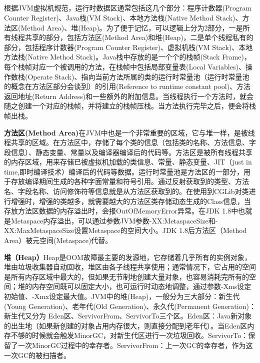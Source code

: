 \documentclass[../../../interview-questions.tex]{subfiles}
\begin{document}
\subsection{\color{red}{Java内存模型(Java Memory Model)}}

根据JVM虚拟机规范，运行时数据区通常包括这几个部分：程序计数器(Program Counter Register)、Java栈(VM Stack)、本地方法栈(Native Method Stack)、方法区(Method Area)、堆(Heap)。为了便于记忆，可以逻辑上分为2部分，一是所有线程共享的部分，包括方法区(Method Area)和堆(Heap)，二是单个线程私有的部分，包括程序计数器(Program Counter Register)、虚拟机栈(VM Stack)、本地方法栈(Native Method Stack)。Java栈中存放的是一个个的栈帧(Stack Frame)，每个栈帧对应一个被调用的方法，在栈帧中包括局部变量表(Local Variables)、操作数栈(Operate Stack)、指向当前方法所属的类的运行时常量池（运行时常量池的概念在方法区部分会谈到）的引用(Reference to runtime constant pool)、方法返回地址(Return Address)和一些额外的附加信息。当线程执行一个方法时，就会随之创建一个对应的栈帧，并将建立的栈帧压栈。当方法执行完毕之后，便会将栈帧出栈。

\textbf{方法区(Method Area)}在JVM中也是一个非常重要的区域，它与堆一样，是被线程共享的区域。在方法区中，存储了每个类的信息（包括类的名称、方法信息、字段信息）、静态变量、常量以及编译器编译后的代码等。方法区是被所有线程共享的内存区域，用来存储已被虚拟机加载的类信息、常量、静态变量、JIT（just in time,即时编译技术）编译后的代码等数据。运行时常量池是方法区的一部分，用于存放编译期间生成的各种字面常量和符号引用。通过反射获取到的类型、方法名、字段名称、访问修饰符等信息就是从方法区获取到的。在使用到CGLib对类进行增强时，增强的类越多，就需要越大的方法区类存储动态生成的Class信息，当存放方法区数据的内存溢出时，会报OutOfMemoryError异常。在JDK 1.8中也就是Metaspace内存溢出，可以通过参数JVM参数-XX:MetaspaceSize和-XX:MaxMetaspaceSize设置Metaspace的空间大小。JDK 1.8后方法区（Method Area）被元空间(Metaspace)代替。

\textbf{堆（Heap）}Heap是OOM故障最主要的发源地，它存储着几乎所有的实例对象，堆由垃圾收集器自动回收，堆区由各子线程共享使用；通常情况下，它占用的空间是所有内存区域中最大的，但如果无节制地创建大量对象，也容易消耗完所有的空间；堆的内存空间既可以固定大小，也可运行时动态地调整，通过参数-Xms设定初始值、-Xmx设定最大值。JVM中的堆(Heap)，一般分为三大部分：新生代(Young Generation)、老年代(Old Generation)、永久代(Permanent Generation)：新生代又分为 Eden区、ServivorFrom、ServivorTo三个区。Eden区：Java新对象的出生地（如果新创建的对象占用内存很大，则直接分配到老年代）。当Eden区内存不够的时候就会触发MinorGC，对新生代区进行一次垃圾回收。ServivorTo：保留了一次MinorGC过程中的幸存者。ServivorFrom：上一次GC的幸存者，作为这一次GC的被扫描者。
\end{document}
